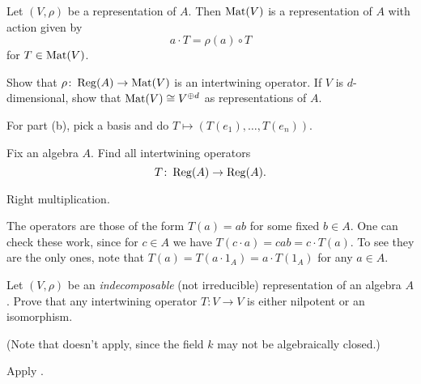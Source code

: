\begin{sproblem}
	\label{prob:reg_mat}
	Let $(V, \rho)$ be a representation of $A$.
	Then $\mathrm{Mat}(V)$ is a representation of $A$
	with action given by
	\[ a \cdot T = \rho(a) \circ T \]
	for $T \in \mathrm{Mat}(V)$.
	\begin{enumerate}[(a)]
		\ii Show that $\rho \colon \operatorname{Reg}(A) \to \mathrm{Mat}(V)$ is an intertwining operator.
		\ii If $V$ is $d$-dimensional, show that $\mathrm{Mat}(V) \cong V^{\oplus d}$
		as representations of $A$.
	\end{enumerate}
	\begin{hint}
		For part (b), pick a basis and do $T \mapsto (T(e_1), \dots, T(e_n))$.
	\end{hint}
\end{sproblem}

\begin{sproblem}
	\label{prob:regA_intertwine}
	Fix an algebra $A$.
	Find all intertwining operators
	\[ T \colon \operatorname{Reg}(A) \to \operatorname{Reg}(A). \]
	\begin{hint}
		Right multiplication.
	\end{hint}
	\begin{sol}
		The operators are those of the form $T(a) = ab$
		for some fixed $b \in A$.
		One can check these work, since for $c \in A$
		we have $T(c \cdot a) = cab = c \cdot T(a)$.
		To see they are the only ones, note that
		$T(a) = T(a \cdot 1_A) = a \cdot T(1_A)$ for any $a \in A$.
	\end{sol}
\end{sproblem}

\begin{problem}
	\gim
	Let $(V, \rho)$ be an \emph{indecomposable}
	(not irreducible) representation of an algebra $A$.
	Prove that any intertwining operator $T \colon V \to V$
	is either nilpotent or an isomorphism.

	(Note that  doesn't apply,
	since the field $k$ may not be algebraically closed.)
	\begin{hint}
		Apply .
	\end{hint}
\end{problem}
